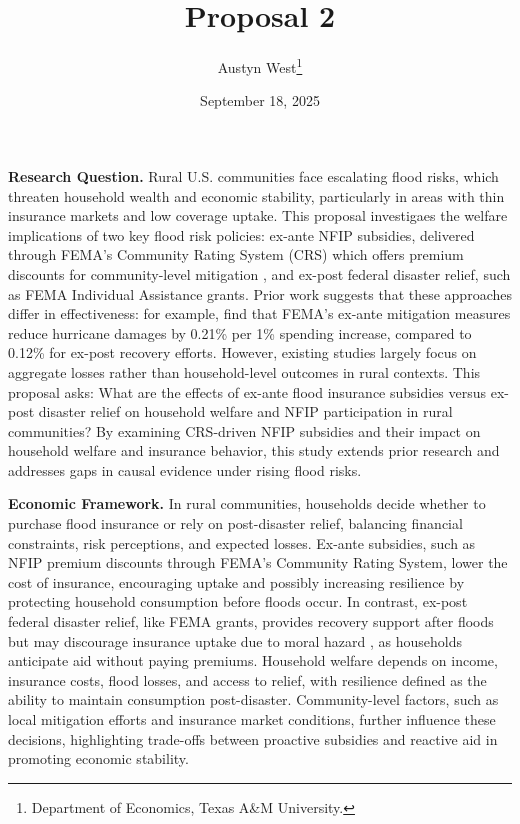 


\begin{singlespace}
\title{Proposal 2}
\author{Austyn West\thanks{Department of Economics, Texas A\&M University.}}
\date{September 18, 2025}
\maketitle
\end{singlespace}

\textbf{Research Question.} Rural U.S. communities face escalating flood risks, which threaten household wealth and economic stability, particularly in areas with thin insurance markets and low coverage uptake. This proposal investigaes the welfare implications of two key flood risk policies: ex-ante NFIP subsidies, delivered through FEMA’s Community Rating System (CRS) which offers premium discounts for community-level mitigation \citep{CommunityRatingSystem2020}, and ex-post federal disaster relief, such as FEMA Individual Assistance grants. Prior work suggests that these approaches differ in effectiveness: for example, \citet{Davlasheridze2017} find that FEMA’s ex-ante mitigation measures reduce hurricane damages by 0.21\% per 1\% spending increase, compared to 0.12\% for ex-post recovery efforts. However, existing studies largely focus on aggregate losses rather than household-level outcomes in rural contexts. This proposal asks: What are the effects of ex-ante flood insurance subsidies versus ex-post disaster relief on household welfare and NFIP participation in rural communities? By examining CRS-driven NFIP subsidies and their impact on household welfare and insurance behavior, this study extends prior research and addresses gaps in causal evidence under rising flood risks.

\textbf{Economic Framework.} In rural communities, households decide whether to purchase flood insurance or rely on post-disaster relief, balancing financial constraints, risk perceptions, and expected losses. Ex-ante subsidies, such as NFIP premium discounts through FEMA’s Community Rating System, lower the cost of insurance, encouraging uptake and possibly increasing resilience by protecting household consumption before floods occur. In contrast, ex-post federal disaster relief, like FEMA grants, provides recovery support after floods but may discourage insurance uptake due to moral hazard \citep{Kousky2018}, as households anticipate aid without paying premiums. Household welfare depends on income, insurance costs, flood losses, and access to relief, with resilience defined as the ability to maintain consumption post-disaster. Community-level factors, such as local mitigation efforts and insurance market conditions, further influence these decisions, highlighting trade-offs between proactive subsidies and reactive aid in promoting economic stability.


